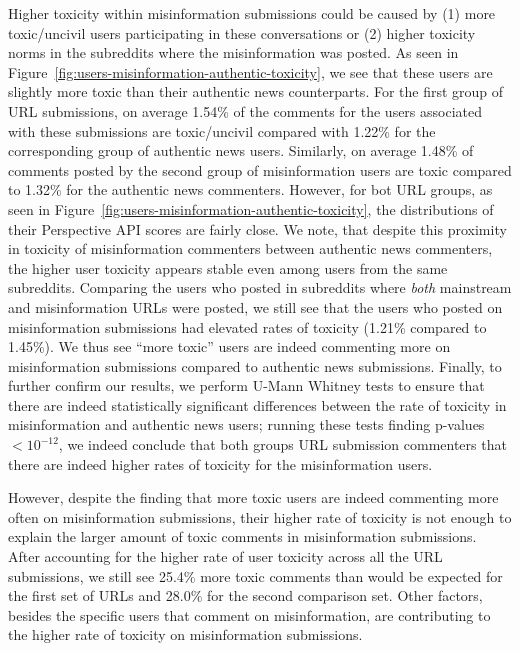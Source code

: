 Higher toxicity within misinformation submissions could be caused by (1) more toxic/uncivil users participating in these conversations or (2) higher toxicity norms in the subreddits where the misinformation was posted. As seen in Figure~\ref{fig:users-misinformation-authentic-toxicity}, we see that these users are slightly more toxic than their authentic news counterparts. For the first group of URL submissions, on average 1.54\% of the comments for the users associated with these submissions are toxic/uncivil compared with 1.22\% for the corresponding group of authentic news users. Similarly, on average 1.48\% of comments posted by the second group of misinformation users are toxic compared to 1.32\% for the authentic news commenters. However, for bot URL groups, as seen in Figure~\ref{fig:users-misinformation-authentic-toxicity}, the distributions of their Perspective API scores are fairly close. We note, that despite this proximity in toxicity of misinformation commenters between authentic news commenters, the higher user toxicity appears stable even among users from the same subreddits. Comparing the users who posted in subreddits where \emph{both} mainstream and misinformation URLs were posted, we still see that the users who posted on misinformation submissions had elevated rates of toxicity (1.21\% compared to 1.45\%). We thus see ``more toxic'' users are indeed commenting more on misinformation submissions compared to authentic news submissions. Finally, to further confirm our results, we perform U-Mann Whitney tests to ensure that there are indeed statistically significant differences between the rate of toxicity in misinformation and authentic news users; running these tests finding p-values $<10^{-12}$, we indeed conclude that both groups URL submission commenters that there are indeed higher rates of toxicity for the misinformation users.

However, despite the finding that more toxic users are indeed commenting more often on misinformation submissions, their higher rate of toxicity is not enough to explain the larger amount of toxic comments in misinformation submissions. After accounting for the higher rate of user toxicity across all the URL submissions, we still see 25.4\% more toxic comments than would be expected for the first set of URLs and 28.0\% for the second comparison set. Other factors, besides the specific users that comment on misinformation, are contributing to the higher rate of toxicity on misinformation submissions.



